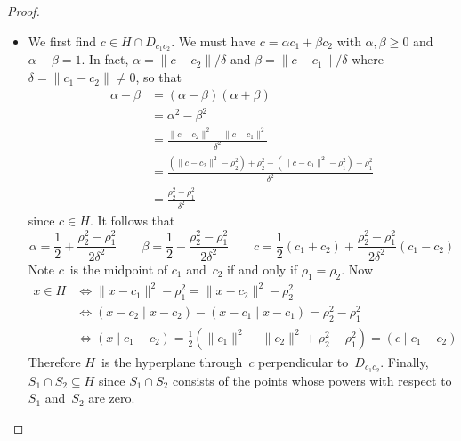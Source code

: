 \documentclass[letterpaper,12pt]{article}
\newcommand{\sect}{\cap}
\newcommand{\norm}[1]{\lVert{#1}\rVert}
\newcommand{\innerprod}[2]{({#1}\;|\;{#2})}
\theoremstyle{definition}
\theoremstyle{remark}
\begin{document}
\begin{proof}
\begin{itemize}[itemsep=0pt]
\item We first find \(c\in H\sect D_{c_1c_2}\). We must have \(c=\alpha c_1+\beta c_2\) with \(\alpha,\beta\ge 0\) and \(\alpha+\beta=1\). In fact, \(\alpha=\norm{c-c_2}/\delta\) and \(\beta=\norm{c-c_1}/\delta\) where \(\delta=\norm{c_1-c_2}\ne 0\), so that
\begin{align*}
\alpha-\beta&=(\alpha-\beta)(\alpha+\beta)\\
	&=\alpha^2-\beta^2\\
	&=\frac{\norm{c-c_2}^2-\norm{c-c_1}^2}{\delta^2}\\
	&=\frac{(\norm{c-c_2}^2-\rho_2^2)+\rho_2^2-(\norm{c-c_1}^2-\rho_1^2)-\rho_1^2}{\delta^2}\\
	&=\frac{\rho_2^2-\rho_1^2}{\delta^2}
\end{align*}
since \(c\in H\). It follows that
\[\alpha=\frac{1}{2}+\frac{\rho_2^2-\rho_1^2}{2\delta^2}\qquad\beta=\frac{1}{2}-\frac{\rho_2^2-\rho_1^2}{2\delta^2}\qquad c=\frac{1}{2}(c_1+c_2)+\frac{\rho_2^2-\rho_1^2}{2\delta^2}(c_1-c_2)\]
Note \(c\)~is the midpoint of \(c_1\) and~\(c_2\) if and only if \(\rho_1=\rho_2\). Now
\begin{align*}
x\in H&\iff\norm{x-c_1}^2-\rho_1^2=\norm{x-c_2}^2-\rho_2^2\\
	&\iff\innerprod{x-c_2}{x-c_2}-\innerprod{x-c_1}{x-c_1}=\rho_2^2-\rho_1^2\\
	&\iff\innerprod{x}{c_1-c_2}=\tfrac{1}{2}(\norm{c_1}^2-\norm{c_2}^2+\rho_2^2-\rho_1^2)=\innerprod{c}{c_1-c_2}
\end{align*}
Therefore \(H\)~is the hyperplane through~\(c\) perpendicular to~\(D_{c_1c_2}\). Finally, \(S_1\sect S_2\subseteq H\) since \(S_1\sect S_2\) consists of the points whose powers with respect to \(S_1\) and~\(S_2\) are zero.


\end{itemize}
\end{proof}
\end{document}
